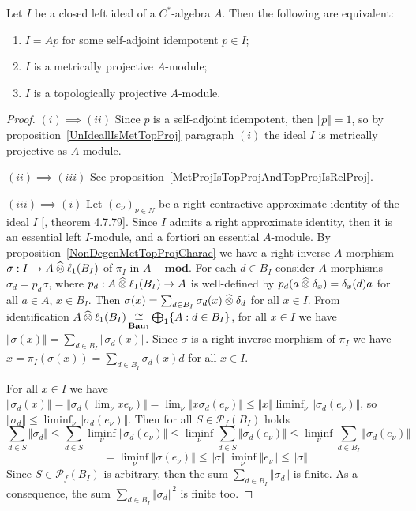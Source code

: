 \begin{theorem}\label{LeftIdealOfCStarAlgMetTopProjCharac} Let $I$ be a closed left
ideal of a $C^*$-algebra $A$. Then the following are equivalent:

\begin{enumerate}[label = (\roman*)]
    \item $I=Ap$ for some self-adjoint idempotent $p\in I$;

    \item $I$ is a metrically projective $A$-module;

    \item $I$ is a topologically projective $A$-module.
\end{enumerate}
\end{theorem}
\begin{proof} $(i)\implies (ii)$ Since $p$ is a self-adjoint idempotent, then
$\Vert p\Vert=1$, so by proposition~\ref{UnIdeallIsMetTopProj} paragraph $(i)$
the ideal $I$ is metrically projective as $A$-module.

$(ii)\implies (iii)$ See
proposition~\ref{MetProjIsTopProjAndTopProjIsRelProj}.

$(iii) \implies (i)$ Let ${(e_\nu)}_{\nu\in N}$ be a right contractive
approximate identity of the ideal $I$ [\cite{HelBanLocConvAlg}, theorem 4.7.79].
Since $I$ admits a right approximate identity, then it is an essential left
$I$-module, and a fortiori an essential $A$-module. By
proposition~\ref{NonDegenMetTopProjCharac} we have a right inverse $A$-morphism
$\sigma:I\to A\mathbin{\widehat{\otimes}} \ell_1(B_I)$ of $\pi_I$ in $A-\mathbf{mod}$. For each
$d\in B_I$ consider $A$-morphisms $\sigma_d=p_d\sigma$, where 
$p_d:A\mathbin{\widehat{\otimes}} \ell_1(B_I)\to A$ is well-defined 
by $p_d(a\mathbin{\widehat{\otimes}} \delta_x)=\delta_x(d)a$ for all $a\in A$, $x\in B_I$. Then
$\sigma(x)=\sum_{d\in B_I}\sigma_d(x)\mathbin{\widehat{\otimes}} \delta_d$ for all $x\in I$. From
identification 
$A\mathbin{\widehat{\otimes}}\ell_1(B_I)\mathop{\mathbin{\cong}}\limits_{\mathbf{Ban}_1}\bigoplus_1 \{ A:d\in B_I \}$, 
for all $x\in I$ we 
have $\Vert\sigma(x)\Vert=\sum_{d\in B_I} \Vert\sigma_d(x)\Vert$. 
Since $\sigma$ is a right inverse morphism of $\pi_I$ we
have $x=\pi_I(\sigma(x))=\sum_{d\in B_I}\sigma_d(x)d$ for all $x\in I$. 

For all $x\in I$ we have 
$\Vert\sigma_d(x)\Vert
=\Vert\sigma_d(\lim_\nu xe_\nu)\Vert
=\lim_\nu\Vert x\sigma_d(e_\nu)\Vert 
\leq\Vert x\Vert\liminf_\nu\Vert\sigma_d(e_\nu)\Vert$, 
so $\Vert\sigma_d\Vert\leq \liminf_\nu\Vert\sigma_d(e_\nu)\Vert$. 
Then for all $S\in\mathcal{P}_{f}(B_I)$ holds
$$
\sum_{d\in S}\Vert \sigma_d\Vert
\leq \sum_{d\in S}\liminf_\nu\Vert \sigma_d(e_\nu)\Vert
\leq \liminf_\nu\sum_{d\in S}\Vert \sigma_d(e_\nu)\Vert
\leq \liminf_\nu\sum_{d\in B_I}\Vert \sigma_d(e_\nu) \Vert
$$
$$
=\liminf_{\nu}\Vert\sigma(e_\nu)\Vert
\leq \Vert\sigma\Vert\liminf_{\nu}\Vert e_\nu\Vert
\leq \Vert\sigma\Vert
$$
Since $S\in \mathcal{P}_{f}(B_I)$ is arbitrary, then the sum 
$\sum_{d\in B_I}\Vert\sigma_d\Vert$ is finite. As a consequence, the 
sum $\sum_{d\in B_I}\Vert\sigma_d\Vert^2$ is finite too. 


\end{proof}
